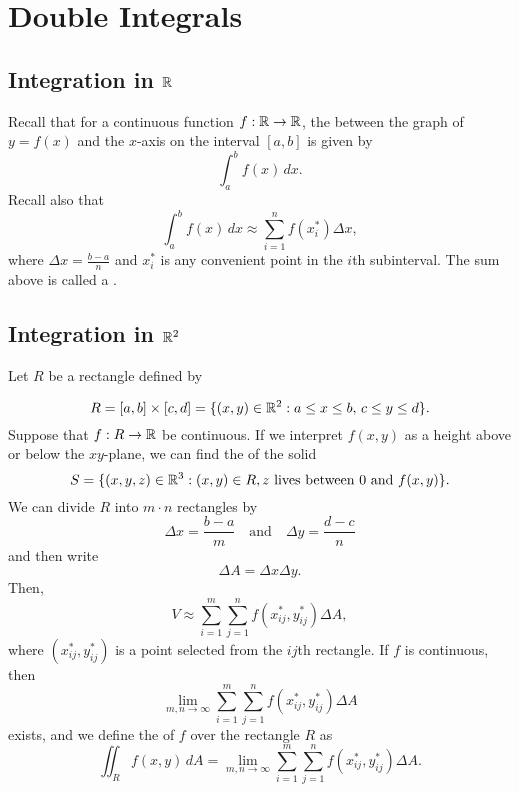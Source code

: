 \section{Double Integrals}

\subsection{Integration in \(\mathbb{R}\)}

Recall that for a continuous function \(f : \mathbb{R} \to \mathbb{R}\), the  between the graph of \(y = f(x)\) and the
\(x\)-axis on the interval \([a, b]\) is given by
\[
  \int_a^b f(x) \, dx.
\]
Recall also that
\[
  \int_a^b f(x) \, dx \approx \sum_{i=1}^n f(x^*_i) \Delta x,
\]
where \(\Delta x = \frac{b-a}{n}\) and \(x^*_i\) is any convenient point in the \(i\)th subinterval. The sum above is called a .

\subsection{Integration in \(\mathbb{R}^2\)}

Let \(R\) be a rectangle defined by

\[
  R = [a, b] \times [c, d] = \{(x, y) \in \mathbb{R}^2 : a \leq x \leq b, \, c \leq y \leq d\}.
\]
Suppose that \(f : R \to \mathbb{R}\) be continuous. If we interpret \(f(x, y)\) as a height above or below the \(xy\)-plane, we can find the  of the solid
\[
  S = \{(x, y, z) \in \mathbb{R}^3 : (x, y) \in R, z \text{ lives between } 0 \text{ and } f(x, y)\}.
\]
We can divide \(R\) into \(m \cdot n\) rectangles by
\[
  \Delta x = \frac{b-a}{m} \quad \text{and} \quad \Delta y = \frac{d-c}{n}
\]
and then write
\[
  \Delta A = \Delta x \Delta y.
\]
Then,
\[
  V \approx \sum_{i=1}^m \sum_{j=1}^n f(x^*_{ij}, y^*_{ij}) \Delta A,
\]
where \((x^*_{ij}, y^*_{ij})\) is a point selected from the \(ij\)th rectangle.
\newpage
If \(f\) is continuous, then
\[
  \lim_{m,n \to \infty} \sum_{i=1}^m \sum_{j=1}^n f(x^*_{ij}, y^*_{ij}) \Delta A
\]
exists, and we define the  of \(f\) over the rectangle \(R\) as
\[
  \iint_R f(x, y) \, dA = \lim_{m,n \to \infty} \sum_{i=1}^m \sum_{j=1}^n f(x^*_{ij}, y^*_{ij}) \Delta A.
\]
